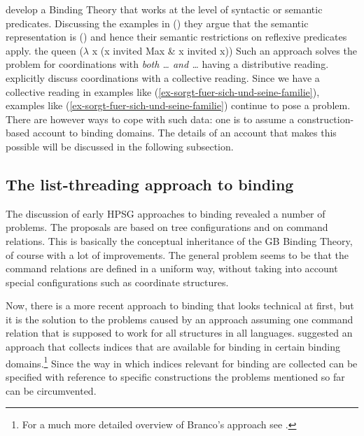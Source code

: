 \documentclass[output=paper,biblatex,babelshorthands,newtxmath,draftmode,colorlinks,citecolor=brown]{langscibook}
\begin{document}
\citet{RR93a} develop a Binding Theory that works at the level of syntactic or semantic
predicates. Discussing the examples in () they argue that the semantic representation is
() and hence their semantic restrictions on reflexive predicates apply.
\eal
{}
\zl
\ea
the queen ($\lambda$ x (x invited Max \& x invited x))
\z
Such an approach solves the problem for coordinations with \emph{both \ldots{} and \ldots} having a
distributive reading. \citet[]{RR93a} explicitly discuss coordinations with a collective
reading. Since we have a collective reading in examples like
(\ref{ex-sorgt-fuer-sich-und-seine-familie}), examples like (\ref{ex-sorgt-fuer-sich-und-seine-familie}) continue to pose a problem. There are
however ways to cope with such data: one is to assume a construction-based account to binding
domains. The details of an account that makes this possible will be discussed in the following subsection.


\subsection{The list-threading approach to binding}


The discussion of early HPSG approaches to binding revealed a number of problems. The proposals are
based on tree configurations and on command relations. This is basically the conceptual inheritance
of the GB Binding Theory, of course with a lot of improvements. The general problem seems to be that
the command relations are defined in a uniform way, without taking into account special configurations such as coordinate structures.

Now, there is a more recent approach to binding that looks technical at first, but it is the
solution to the problems caused by an approach assuming one command relation that is supposed
to work for all structures in all languages. \citet{Branco2002a} suggested an approach that collects
indices that are available for binding in certain binding domains.\footnote{%
For a much more detailed overview of Branco's approach see .
} Since the way in which indices
relevant for binding are collected can be specified with reference to specific constructions the
problems mentioned so far can be circumvented. 
\end{document}
